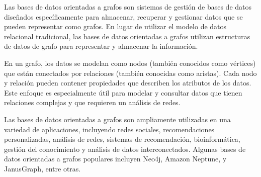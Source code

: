 Las bases de datos orientadas a grafos son sistemas de gestión de bases de datos diseñados específicamente para almacenar, recuperar y gestionar datos que se pueden representar como grafos. En lugar de utilizar el modelo de datos relacional tradicional, las bases de datos orientadas a grafos utilizan estructuras de datos de grafo para representar y almacenar la información.

En un grafo, los datos se modelan como nodos (también conocidos como vértices) que están conectados por relaciones (también conocidas como aristas). Cada nodo y relación pueden contener propiedades que describen los atributos de los datos. Este enfoque es especialmente útil para modelar y consultar datos que tienen relaciones complejas y que requieren un análisis de redes.

Las bases de datos orientadas a grafos son ampliamente utilizadas en una variedad de aplicaciones, incluyendo redes sociales, recomendaciones personalizadas, análisis de redes, sistemas de recomendación, bioinformática, gestión del conocimiento y análisis de datos interconectados. Algunas bases de datos orientadas a grafos populares incluyen Neo4j, Amazon Neptune, y JanusGraph, entre otras.